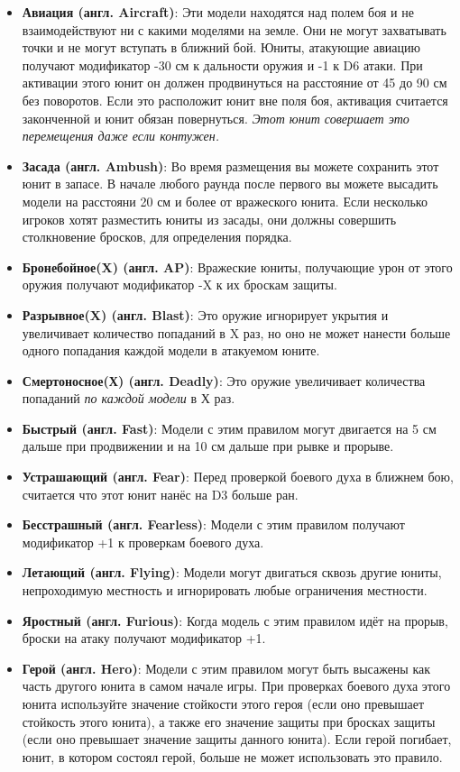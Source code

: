 \documentclass[twocolumn]{article}
\newcommand{\h}[1]{\textbf{#1}}
\newcommand{\D}[1][6]{D#1\xspace}
\begin{document}
\begin{itemize}
    \item \h{Авиация (англ. Aircraft)}: Эти модели находятся над полем боя и не взаимодействуют ни с какими моделями на земле. Они не могут захватывать точки и не могут вступать в ближний бой. Юниты, атакующие авиацию получают модификатор -30 см к дальности оружия и -1 к \D атаки. При активации этого юнит он должен продвинуться на расстояние от 45 до 90 см без поворотов. Если это расположит юнит вне поля боя, активация считается законченной и юнит обязан повернуться. \emph{Этот юнит совершает это перемещения даже если контужен.}
    \item \h{Засада (англ. Ambush)}: Во время размещения вы можете сохранить этот юнит в запасе. В начале любого раунда после первого вы можете высадить модели на расстояни 20 см и более от вражеского юнита. Если несколько игроков хотят разместить юниты из засады, они должны совершить столкновение бросков, для определения порядка.
    \item \h{Бронебойное(X) (англ. AP)}: Вражеские юниты, получающие урон от этого оружия получают модификатор -X к их броскам защиты.
    \item \h{Разрывное(X) (англ. Blast)}: Это оружие игнорирует укрытия и увеличивает количество попаданий в X раз, но оно не может нанести больше одного попадания каждой модели в атакуемом юните.
    \item \h{Смертоносное(Х) (англ. Deadly)}: Это оружие увеличивает количества попаданий \emph{по каждой модели} в Х раз.
    \item \h{Быстрый (англ. Fast)}: Модели с этим правилом могут двигается на 5 см дальше при продвижении и на 10 см дальше при рывке и прорыве.
    \item \h{Устрашающий (англ. Fear)}: Перед проверкой боевого духа в ближнем бою, считается что этот юнит нанёс на \D[3] больше ран.
    \item \h{Бесстрашный (англ. Fearless)}: Модели с этим правилом получают модификатор +1 к проверкам боевого духа.
    \item \h{Летающий (англ. Flying)}: Модели могут двигаться сквозь другие юниты, непроходимую местность и игнорировать любые ограничения местности.
    \item \h{Яростный (англ. Furious)}: Когда модель с этим правилом идёт на прорыв, броски на атаку получают модификатор +1.
    \item \h{Герой (англ. Hero)}: Модели с этим правилом могут быть высажены как часть другого юнита в самом начале игры. При проверках боевого духа этого юнита используйте значение стойкости этого героя (если оно превышает стойкость этого юнита), а также его значение защиты при бросках защиты (если оно превышает значение защиты данного юнита). Если герой погибает, юнит, в котором состоял герой, больше не может использовать это правило.

\end{itemize}
\end{document}
